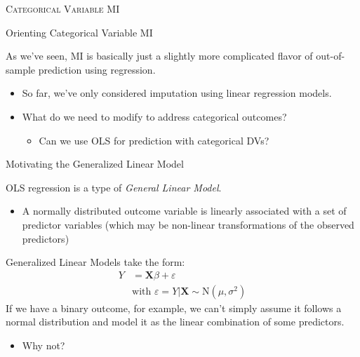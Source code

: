 \documentclass{beamer}
\begin{document}
\begin{frame}

  \begin{center}
    \textsc{\huge{Categorical Variable MI}}
  \end{center}

\end{frame}


\begin{frame}{Orienting Categorical Variable MI}

  As we've seen, MI is basically just a slightly more complicated flavor
  of out-of-sample prediction using regression.
  \vspace{6pt}
  \begin{itemize}
  \item So far, we've only considered imputation using linear regression
    models.
    \vspace{6pt}
  \item What do we need to modify to address categorical outcomes?
    \vspace{6pt}
    \begin{itemize}
    \item Can we use OLS for prediction with categorical DVs?
    \end{itemize}
  \end{itemize}

\end{frame}


\begin{frame}{Motivating the Generalized Linear Model}

  OLS regression is a type of \emph{General Linear Model}.
  \vspace{6pt}
  \begin{itemize}
  \item A normally distributed outcome variable is linearly associated
    with a set of predictor variables (which may be non-linear
    transformations of the observed predictors)
  \end{itemize}
  \vspace{12pt}
  Generalized Linear Models take the form:
  \begin{align*}
    Y &= \mathbf{X}\beta + \varepsilon\\
    &\text{with } \varepsilon = Y|\mathbf{X} \sim \text{N}(\mu, \sigma^2)
  \end{align*}
  If we have a binary outcome, for example, we can't simply assume it
  follows a normal distribution and model it as the linear combination
  of some predictors.
  \vspace{6pt}
  \begin{itemize}
  \item Why not?
  \end{itemize}

\end{frame}
\end{document}
